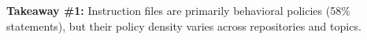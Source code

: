 \begin{tcolorbox}[colback=blue!5!white,colframe=gray!75!black,left=1mm, right=1mm, top=0.5mm, bottom=0.5mm, arc=1mm]
\textbf{Takeaway \#1:} Instruction files are primarily behavioral policies (58\% statements), but their policy density varies across repositories and topics.
\end{tcolorbox}






